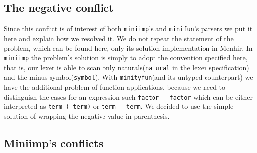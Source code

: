 \documentclass[a4paper,11pt]{report}
\begin{document}
\subsection{The negative conflict}

Since this conflict is of interest of both \verb|miniimp|'s and \verb|minifun|'s parsers we put it here and explain how we resolved it.
We do not repeat the statement of the problem, which can be found \href{https://lceragioli.github.io/pages/Slides/parsingErrataCorrige.pdf}{here}, only its solution implementation in Menhir.
In \verb|miniimp| the problem's solution is simply to adopt the convention specified \href{https://lceragioli.github.io/pages/Slides/parsingErrataCorrige.pdf}{here}, that is, our lexer is able to scan only naturals(\verb|natural| in the lexer specification) and the minus symbol(\verb|symbol|).
With \verb|minityfun|(and its untyped counterpart) we have the additional problem of function applications, because we need to distinguish the cases for an expression such \verb|factor - factor| which can be either interpreted as \verb|term (-term)| or \verb|term - term|. We decided to use the simple solution of wrapping the negative value in parenthesis.

\subsection{Miniimp's conflicts}
\end{document}
